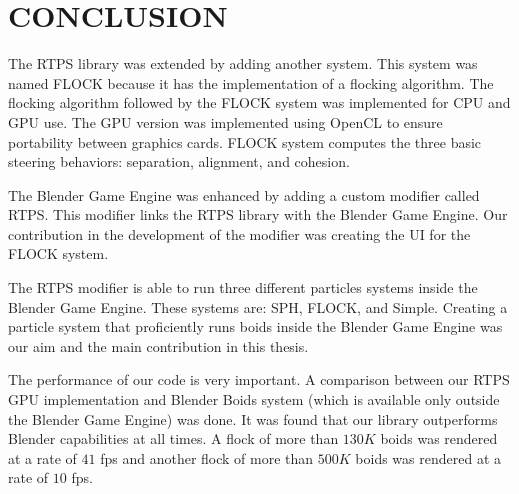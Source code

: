 \chapter{CONCLUSION}\label{conclusionChapter}


The RTPS library was extended by adding another system. This system was named FLOCK because it has the implementation of a flocking algorithm. The flocking algorithm followed by the FLOCK system was implemented for CPU and GPU use. The GPU version was implemented using OpenCL to ensure portability between graphics cards. FLOCK system computes the three basic steering behaviors: separation, alignment, and cohesion. 

The Blender Game Engine was enhanced by adding a custom modifier called RTPS. This modifier links the RTPS library with the Blender Game Engine. Our contribution in the development of the modifier was creating the UI for the FLOCK system.

The RTPS modifier is able to run three different particles systems inside the Blender Game Engine. These systems are: SPH, FLOCK, and Simple. Creating a particle system that proficiently runs boids inside the Blender Game Engine was our aim and the main contribution in this thesis.

The performance of our code is very important. A comparison between our RTPS GPU implementation and Blender Boids system (which is available only outside the Blender Game Engine) was done. It was found that our library outperforms Blender capabilities at all times. A flock of more than $130K$ boids was rendered at a rate of $41$ fps and another flock of more than $500K$ boids was rendered at a rate of $10$ fps. 
